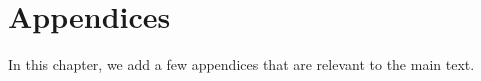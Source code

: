\chapter*{Appendices}

In this chapter, we add a few appendices that are relevant to the main text.

